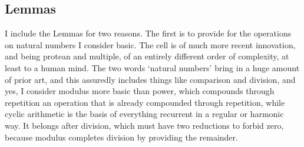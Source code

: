 \documentclass[twoside]{article}
\begin{document}
\subsection{Lemmas}







I include the Lemmas for two reasons. The first is to provide for the operations on natural numbers I consider basic. The cell is of much more recent innovation, and being protean and multiple, of an entirely different order of complexity, at least to a human mind. The two words `natural numbers' bring in a huge amount of prior art, and this assuredly includes things like comparison and division, and yes, I consider modulus more basic than power, which compounds through repetition an operation that is already compounded through repetition, while cyclic arithmetic is the basis of everything recurrent in a regular or harmonic way. It belongs after division, which must have two reductions to forbid zero, because modulus completes division by providing the remainder.
\end{document}
